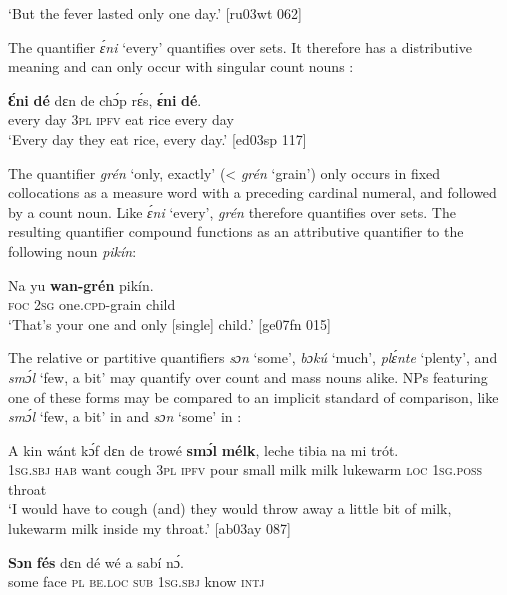 \glt ‘But the fever lasted only one day.’ [ru03wt 062]
\z

The quantifier \textit{ɛ́ni} ‘every’ quantifies over sets. It therefore has a distributive meaning and can only occur with singular count nouns :


\ea%
    \label{ex:key:271}
    \gll \textbf{Ɛ́ni}    \textbf{dé}  dɛn  de  chɔ́p  rɛ́s,  \textbf{ɛ́ni}    \textbf{dé}.\\
every  day  \textsc{3pl}  \textsc{ipfv}  eat    rice  every  day\\

\glt ‘Every day they eat rice, every day.’ [ed03sp 117]
\z

The quantifier \textit{grén} ‘only, exactly’ (< \textit{grén} ‘grain’) only occurs in fixed collocations as a measure word with a preceding cardinal numeral, and followed by a count noun. Like \textit{ɛ́ni} ‘every’, \textit{grén} therefore quantifies over sets. The resulting quantifier compound{\fff} functions as an attributive quantifier to the following noun \textit{pikín}:


\ea%
    \label{ex:key:272}
    \gll Na  yu  \textbf{wan-grén} pikín.\\
\textsc{foc}  \textsc{2sg}  one.\textsc{cpd}{}-grain  child\\

\glt ‘That’s your one and only [single] child.’ [ge07fn 015]
\z

The relative or partitive{\fff} quantifiers \textit{sɔn} ‘some’, \textit{bɔkú} ‘much’, \textit{plɛ́nte} ‘plenty’, and \textit{smɔ́l} ‘few, a bit’ may quantify over count and mass nouns alike. NPs featuring one of these forms may be compared to an implicit standard of comparison, like \textit{smɔ́l} ‘few, a bit’ in  and \textit{sɔn} ‘some’ in : 


\ea%
    \label{ex:key:273}
    \gll \MakeUppercase{A}   kin  wánt  kɔ́f    dɛn  de  trowé  \textbf{smɔ́l} \textbf{ mélk},
leche  tibia      na  mi    trót.\\
\textsc{1sg.sbj}  \textsc{hab}  want  cough  \textsc{3pl}  \textsc{ipfv}  pour  small  milk
milk    lukewarm  \textsc{loc}  \textsc{1sg.poss}  throat\\
\glt ‘I would have to cough (and) they would throw away a little bit of milk,
lukewarm milk inside my throat.’ [ab03ay 087]
\z


\ea%
    \label{ex:key:274}
    \gll \textbf{Sɔn} \textbf{   fés}  dɛn  dé    wé  a    sabí    nɔ́.\\
some  face  \textsc{pl}  \textsc{be.loc}  \textsc{sub}  \textsc{1sg.sbj}  know  \textsc{intj}\\

